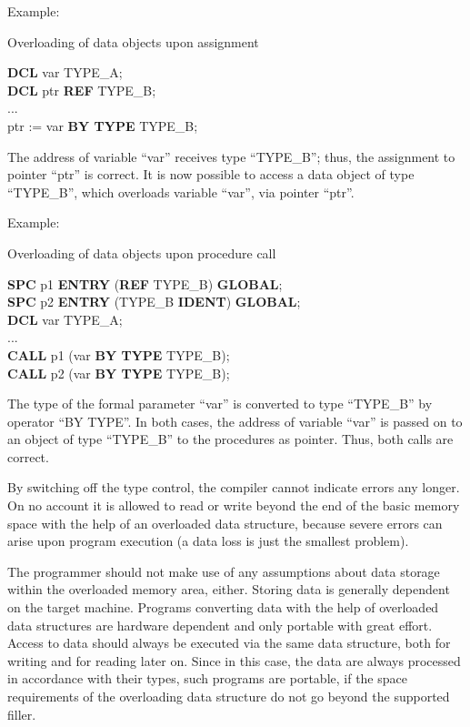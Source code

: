 \begin{removed}
Example:

Overloading of data objects upon assignment

{\bf DCL} var \x        TYPE\_A;\\
{\bf DCL} ptr {\bf REF} TYPE\_B;\\
...\\
ptr := var {\bf BY TYPE} TYPE\_B;

The address of variable ``var'' receives type ``TYPE\_B''; thus, the
assignment to pointer ``ptr'' is correct. It is now possible to access a
data object of type ``TYPE\_B'', which overloads variable ``var'', via
pointer ``ptr''.

Example:

Overloading of data objects upon procedure call

{\bf SPC} p1 {\bf ENTRY} ({\bf REF} TYPE\_B) {\bf GLOBAL};\\
{\bf SPC} p2 {\bf ENTRY} (TYPE\_B {\bf IDENT}) {\bf GLOBAL};\\
{\bf DCL} var TYPE\_A;\\
...\\
{\bf CALL} p1 (var {\bf BY TYPE} TYPE\_B);\\
{\bf CALL} p2 (var {\bf BY TYPE} TYPE\_B);

The type of the formal parameter ``var'' is converted to type
``TYPE\_B'' by operator ``BY TYPE''. In both cases, the address of
variable ``var'' is passed on to an object of type ``TYPE\_B'' to the
procedures as pointer. Thus, both calls are correct.

By switching off the type control, the compiler cannot indicate errors
any longer. On no account it is allowed to read or write beyond the end
of the basic memory space with the help of an overloaded data structure,
because severe errors can arise upon program execution (a data loss is
just the smallest problem).

The programmer should not make use of any assumptions about data storage
within the overloaded memory area, either. Storing data is generally
dependent on the target machine. Programs converting data with the help
of overloaded data structures are hardware dependent and only portable
with great effort. Access to data should always be executed via the same
data structure, both for writing and for reading later on. Since in
this case, the data are always processed in accordance with their types,
such programs are portable, if the space requirements of the overloading
data structure do not go beyond the supported filler.


\end{removed}
